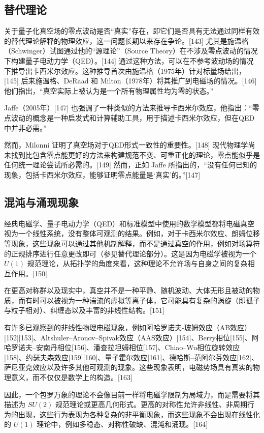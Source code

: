 \subsection{替代理论} 
关于量子化真空场的零点波动是否“真实”存在，即它们是否具有无法通过同样有效的替代理论解释的物理效应，这一问题长期以来存在争论。[143] 尤其是施温格（Schwinger）试图通过他的“源理论”（Source Theory）在不涉及零点波动的情况下构建量子电动力学（QED）。[144] 通过这种方法，可以在不参考波动场的情况下推导出卡西米尔效应。这种推导首次由施温格（1975年）针对标量场给出，[145] 后来施温格、DeRaad 和 Milton（1978年）将其推广到电磁场的情况。[146] 他们指出，“真空实际上被认为是一个所有物理属性均为零的状态。”  

Jaffe（2005年）[147] 也强调了一种类似的方法来推导卡西米尔效应，他指出：“零点波动的概念是一种启发式和计算辅助工具，用于描述卡西米尔效应，但在QED中并非必需。”

然而，Milonni 证明了真空场对于QED形式一致性的重要性。[148] 现代物理学尚未找到比包含零点能更好的方法来构建规范不变、可重正化的理论，零点能似乎是任何统一理论尝试所必需的。[149] 然而，正如 Jaffe 所指出的，“没有任何已知的现象，包括卡西米尔效应，能够证明零点能量是‘真实’的。”[147]
\subsection{混沌与涌现现象} 
经典电磁学、量子电动力学（QED）和标准模型中使用的数学模型都将电磁真空视为一个线性系统，没有整体可观测的结果。例如，对于卡西米尔效应、朗姆位移等现象，这些现象可以通过其他机制解释，而不是通过真空的作用，例如对场算符的正规排序进行任意更改即可（参见替代理论部分）。这是因为电磁学被视为一个 \( U(1) \) 规范理论，从拓扑学的角度来看，这种理论不允许场与自身之间的复杂相互作用。[150]  

在更高对称群以及现实中，真空并不是一种平静、随机波动、大体无形且被动的物质，而有时可以被视为一种湍流的虚拟等离子体，它可能具有复杂的涡旋（即孤子与粒子相对）、纠缠态以及丰富的非线性结构。[151]  

有许多已观察到的非线性物理电磁现象，例如阿哈罗诺夫-玻姆效应（AB效应）[152][153]、Altshuler–Aronov–Spivak效应（AAS效应）[154]、Berry相位[155]、阿哈罗诺夫–安南丹相位[156]、潘查拉坦姆相位[157]、Chiao–Wu相位旋转效应[158]、约瑟夫森效应[159][160]、量子霍尔效应[161]、德哈斯–范阿尔芬效应[162]、萨尼亚克效应以及许多其他可观测的现象。这些现象表明，电磁势场具有真实的物理意义，而不仅仅是数学上的构造。[163]  

因此，一个包罗万象的理论不会像目前一样将电磁学限制为局域力，而是需要将其描述为 \( SU(2) \) 规范理论或更高几何形式。更高的对称性允许非线性、非周期行为的出现，这些行为表现为各种复杂的非平衡现象，而这些现象不会出现在线性化的 \( U(1) \) 理论中，例如多稳态、对称性破缺、混沌和涌现。[164]


